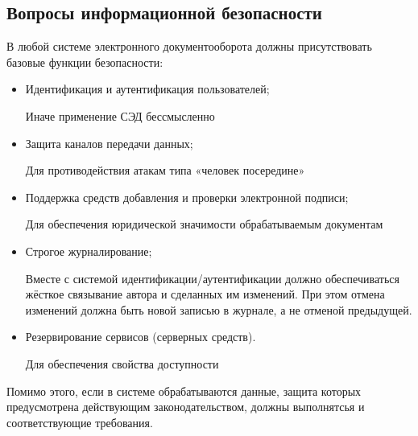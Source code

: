 \subsection{Вопросы информационной безопасности} \label{review_security}

В любой системе электронного документооборота должны присутствовать базовые функции безопасности:
\begin{itemize}
	\item Идентификация и аутентификация пользователей;

	Иначе применение СЭД бессмысленно
	\item Защита каналов передачи данных;

	Для противодействия атакам типа «человек посередине»
	\item Поддержка средств добавления и проверки электронной подписи;

	Для обеспечения юридической значимости обрабатываемым документам
	\item Строгое журналирование;

	Вместе с системой идентификации/аутентификации должно обеспечиваться жёсткое связывание автора и сделанных им изменений. При этом отмена изменений должна быть новой записью в журнале, а не отменой предыдущей.
	\item Резервирование сервисов (серверных средств).

	Для обеспечения свойства доступности
\end{itemize}

Помимо этого, если в системе обрабатываются данные, защита которых предусмотрена действующим законодательством, должны выполнятсья и соответствующие требования.